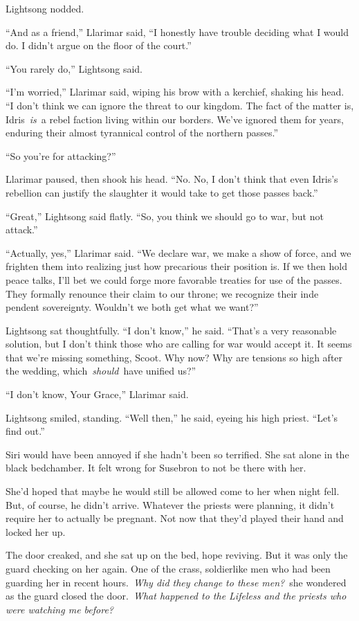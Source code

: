 Lightsong nodded.

“And as a friend,” Llarimar said, “I honestly have trouble deciding what I would do. I didn’t argue on the floor of the court.”

“You rarely do,” Lightsong said.

“I’m worried,” Llarimar said, wiping his brow with a kerchief, shaking his head. “I don’t think we can ignore the threat to our kingdom. The fact of the matter is, Idris~\textit{is}~a rebel faction living within our borders. We’ve ignored them for years, enduring their almost tyrannical control of the northern passes.”

“So you’re for attacking?”

Llarimar paused, then shook his head. “No. No, I don’t think that even Idris’s rebellion can justify the slaughter it would take to get those passes back.”

“Great,” Lightsong said flatly. “So, you think we should go to war, but not attack.”

“Actually, yes,” Llarimar said. “We declare war, we make a show of force, and we frighten them into realizing just how precarious their position is. If we then hold peace talks, I’ll bet we could forge more favorable treaties for use of the passes. They formally renounce their claim to our throne; we recognize their inde pendent sovereignty. Wouldn’t we both get what we want?”

Lightsong sat thoughtfully. “I don’t know,” he said. “That’s a very reasonable solution, but I don’t think those who are calling for war would accept it. It seems that we’re missing something, Scoot. Why now? Why are tensions so high after the wedding, which~\textit{should}~have unified us?”

“I don’t know, Your Grace,” Llarimar said.

Lightsong smiled, standing. “Well then,” he said, eyeing his high priest. “Let’s find out.”

\orn

Siri would have been annoyed if she hadn’t been so terrified. She sat alone in the black bedchamber. It felt wrong for Susebron to not be there with her.

She’d hoped that maybe he would still be allowed come to her when night fell. But, of course, he didn’t arrive. Whatever the priests were planning, it didn’t require her to actually be pregnant. Not now that they’d played their hand and locked her up.

The door creaked, and she sat up on the bed, hope reviving. But it was only the guard checking on her again. One of the crass, soldierlike men who had been guarding her in recent hours.~\textit{Why did they change to these men?}~she wondered as the guard closed the door.~\textit{What happened to the Lifeless and the priests who were watching me before?}

